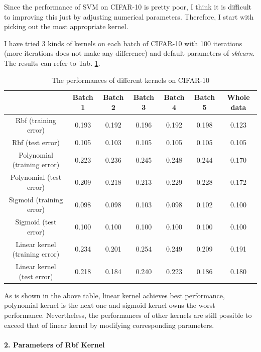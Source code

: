 \documentclass[12pt,a4paper]{article}
\theoremstyle{definition}
\begin{document}
\vspace{0.01\linewidth}
Since the performance of SVM on CIFAR-10 is pretty poor, I think it is difficult to improving this just by adjusting numerical parameters. Therefore, I start with picking out the most appropriate kernel.

\vspace{0.01\linewidth}
I have tried 3 kinds of kernels on each batch of CIFAR-10 with 100 iterations (more iterations does not make any difference) and default parameters of \textit{sklearn}. The results can refer to Tab. \ref{tab:bonus-kernel}.

\begin{table}[H]
	\renewcommand\arraystretch{1.35}
	\caption{The performances of different kernels on CIFAR-10}
	\label{tab:bonus-kernel}
	\centering
	
	\begin{tabular}{c|c|c|c|c|c|c}
		\centering
		 & Batch 1 & Batch 2 & Batch 3 & Batch 4 & Batch 5 & Whole data \\
		\hline
		\hline
		
		Rbf (training error) & 0.193 & 0.192 & 0.196 & 0.192 & 0.198 &  0.123 \\
		Rbf (test error) & 0.105 & 0.103 & 0.105 & 0.105 & 0.105 & 0.105 \\
		Polynomial (training error) & 0.223 & 0.236 & 0.245 & 0.248 & 0.244 & 0.170 \\
		Polynomial (test error) & 0.209 & 0.218 & 0.213 & 0.229 & 0.228 & 0.172 \\
		Sigmoid (training error) & 0.098 & 0.098 & 0.103 & 0.098 & 0.102 & 0.100 \\
		Sigmoid (test error) & 0.100 & 0.100 & 0.100 & 0.100 & 0.100 & 0.100 \\
		Linear kernel (training error) & 0.234 & 0.201 & 0.254 & 0.249 & 0.209 & 0.191 \\
		Linear kernel (test error) & 0.218 & 0.184 & 0.240 & 0.223 & 0.186 & 0.180 \\
	\end{tabular}
\end{table}

As is shown in the above table, linear kernel achieves best performance, polynomial kernel is the next one and sigmoid kernel owns the worst performance. Nevertheless, the performances of other kernels are still possible to exceed that of linear kernel by modifying corresponding parameters.

\paragraph{2. Parameters of Rbf Kernel}
\end{document}
